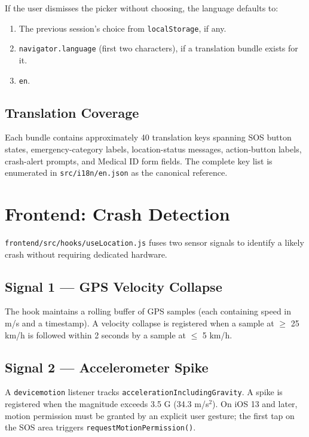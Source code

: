 \documentclass[11pt, a4paper]{article}
\newcommand{\file}[1]{\texttt{\small\color{rsblue}#1}}
\newcommand{\code}[1]{\texttt{\small#1}}
\begin{document}
If the user dismisses the picker without choosing, the language defaults to:

\begin{enumerate}[leftmargin=*, itemsep=2pt, topsep=2pt]
  \item The previous session's choice from \code{localStorage}, if any.
  \item \code{navigator.language} (first two characters), if a translation bundle exists for it.
  \item \code{en}.
\end{enumerate}

\subsection{Translation Coverage}

Each bundle contains approximately 40 translation keys spanning SOS button states, emergency-category labels, location-status messages, action-button labels, crash-alert prompts, and Medical ID form fields. The complete key list is enumerated in \file{src/i18n/en.json} as the canonical reference.

\section{Frontend: Crash Detection}

\file{frontend/src/hooks/useLocation.js} fuses two sensor signals to identify a likely crash without requiring dedicated hardware.

\subsection{Signal 1 --- GPS Velocity Collapse}

The hook maintains a rolling buffer of GPS samples (each containing speed in m/s and a timestamp). A velocity collapse is registered when a sample at $\ge$ 25 km/h is followed within 2 seconds by a sample at $\le$ 5 km/h.

\subsection{Signal 2 --- Accelerometer Spike}

A \code{devicemotion} listener tracks \code{accelerationIncludingGravity}. A spike is registered when the magnitude exceeds 3.5 G (34.3 m/s$^2$). On iOS 13 and later, motion permission must be granted by an explicit user gesture; the first tap on the SOS area triggers \code{requestMotionPermission()}.
\end{document}
